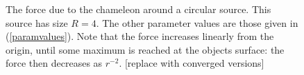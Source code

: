 \documentclass[a4paper, 12pt]{article}
\numberwithin{equation}{section}
\newcommand{\note}[1]{{\color{blue}[#1]}}
\begin{document}
\begin{figure}[!t]
      \begin{center}
      \end{center}
\caption{ The force due to the chameleon around a circular source. This source has size $R=4$. The other parameter values are those given in (\ref{paramvalues}).  Note that the force increases linearly from the origin, until some maximum is reached at the objects surface: the force then decreases as $r^{-2}$. \note{replace with converged versions}}\label{fig:circ}
\end{figure}
\end{document}
